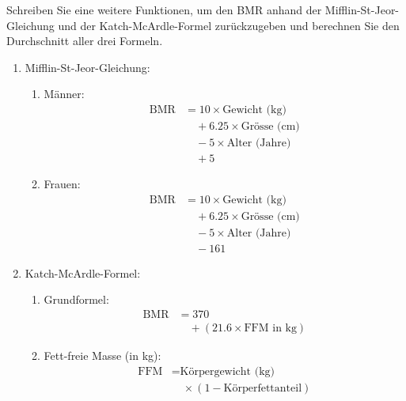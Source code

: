\begin{mysubmission}\label{ex:bmr}
	Schreiben Sie eine weitere Funktionen, um den \gls{BMR} anhand der Mifflin-St-Jeor-Gleichung und der Katch-McArdle-Formel zurückzugeben und berechnen Sie den Durchschnitt aller drei Formeln.
	\begin{enumerate}
		\item Mifflin-St-Jeor-Gleichung:
		      \begin{enumerate}
			      \item Männer:
			            \begin{align*}
				            \text{BMR} & = 10 \times \text{Gewicht (kg)}        \\
				                       & \quad + 6.25 \times \text{Grösse (cm)} \\
				                       & \quad - 5 \times \text{Alter (Jahre)}  \\
				                       & \quad + 5
			            \end{align*}
			      \item Frauen:
			            \begin{align*}
				            \text{BMR} & = 10 \times \text{Gewicht (kg)}        \\
				                       & \quad + 6.25 \times \text{Grösse (cm)} \\
				                       & \quad - 5 \times \text{Alter (Jahre)}  \\
				                       & \quad - 161
			            \end{align*}
		      \end{enumerate}
		\item Katch-McArdle-Formel:
		      \begin{enumerate}
			      \item Grundformel:
			            \begin{align*}
				            \text{BMR} & = 370                                  \\
				                       & \quad + (21.6 \times \text{FFM in kg})
			            \end{align*}

			      \item Fett-freie Masse (in kg):
			            \begin{align*}
				            \text{FFM} & = \text{Körpergewicht (kg)}                \\
				                       & \quad \times (1 - \text{Körperfettanteil})
			            \end{align*}

		      \end{enumerate}

	\end{enumerate}

	\begin{myanswer}
		
	\end{myanswer}
\end{mysubmission}

